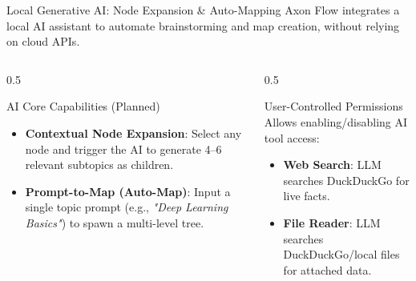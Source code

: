 \documentclass[aspectratio=169, 10pt]{beamer}
\begin{document}
\begin{frame}{Local Generative AI: Node Expansion \& Auto-Mapping}
  Axon Flow integrates a local AI assistant to automate brainstorming and map creation, without relying on cloud APIs.
  \vspace{0.4em}
  \begin{columns}
    \begin{column}{0.5\textwidth}
      \begin{block}{AI Core Capabilities (Planned)}
        \begin{itemize}
          \item[\textcolor{axonpurple}{\tiny$\blacksquare$}] \textbf{Contextual Node Expansion}: Select any node and trigger the AI to generate 4--6 relevant subtopics as children.
          \item[\textcolor{axonpurple}{\tiny$\blacksquare$}] \textbf{Prompt-to-Map (Auto-Map)}: Input a single topic prompt (e.g., \textit{"Deep Learning Basics"}) to spawn a multi-level tree.
        \end{itemize}
      \end{block}
    \end{column}
    \begin{column}{0.5\textwidth}
      \begin{block}{User-Controlled Permissions}
        Allows enabling/disabling AI tool access:
        \begin{itemize}
          \item \textbf{Web Search}: LLM searches DuckDuckGo for live facts.
          \item \textbf{File Reader}: LLM searches DuckDuckGo/local files for attached data.
        \end{itemize}
      \end{block}
    \end{column}
  \end{columns}
\end{frame}
\end{document}

